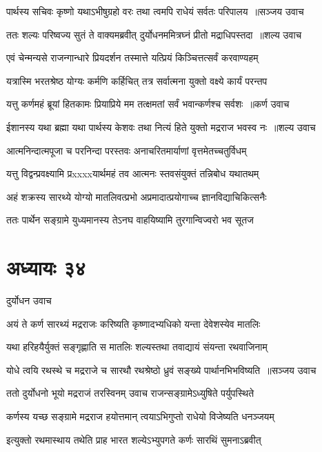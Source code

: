 \threelineshloka
{पार्थस्य सचिवः कृष्णो यथाऽभीषुग्रहो वरः}
{तथा त्वमपि राधेयं सर्वतः परिपालय ॥सञ्जय उवाच}
{}


\threelineshloka
{ततः शल्यः परिष्वज्य सुतं ते वाक्यमब्रवीत्}
{दुर्योधनममित्रघ्नं प्रीतो मद्राधिपस्तदा ॥शल्य उवाच}
{}


\twolineshloka
{एवं चेन्मन्यसे राजन्गान्धारे प्रियदर्शन}
{तस्मात्ते यत्प्रियं किञ्चित्तत्सर्वं करवाण्यहम्}


\twolineshloka
{यत्रास्मि भरतश्रेष्ठ योग्यः कर्मणि कर्हिचित्}
{तत्र सर्वात्मना युक्तो वक्ष्ये कार्यं परन्तप}


\threelineshloka
{यत्तु कर्णमहं ब्रूयां हितकामः प्रियाप्रिये}
{मम तत्क्षमतां सर्वं भवान्कर्णश्च सर्वशः ॥कर्ण उवाच}
{}


\threelineshloka
{ईशानस्य यथा ब्रह्मा यथा पार्थस्य केशवः}
{तथा नित्यं हिते युक्तो मद्रराज भवस्व नः ॥शल्य उवाच}
{}


\twolineshloka
{आत्मनिन्दात्मपूजा च परनिन्दा परस्तवः}
{अनाचरितमार्याणां वृत्तमेतच्चतुर्विधम्}


\twolineshloka
{यत्तु विद्वन्प्रवक्ष्यामि प्रxxxxयार्थमहं तव}
{आत्मनः स्तवसंयुक्तं तन्निबोध यथातथम्}


\twolineshloka
{अहं शक्रस्य सारथ्ये योग्यो मातलिवत्प्रभो}
{अप्रमादात्प्रयोगाच्च ज्ञानविद्याचिकित्सनैः}


\twolineshloka
{ततः पार्थेन सङ्ग्रामे युध्यमानस्य तेऽनघ}
{वाहयिष्यामि तुरगान्विज्वरो भव सूतज}


\chapter{अध्यायः ३४}
\twolineshloka
{दुर्योधन उवाच}
{}


\twolineshloka
{अयं ते कर्ण सारथ्यं मद्रराजः करिष्यति}
{कृष्णादभ्यधिको यन्ता देवेशस्येव मातलिः}


\twolineshloka
{यथा हरिहयैर्युक्तं सङ्गृह्णाति स मातलिः}
{शल्यस्तथा तवाद्यायं संयन्ता रथवाजिनाम्}


\threelineshloka
{योधे त्वयि रथस्थे च मद्रराजे च सारथौ}
{रथश्रेष्ठो ध्रुवं सङ्ख्ये पार्थानभिभविष्यति ॥सञ्जय उवाच}
{}


\twolineshloka
{ततो दुर्योधनो भूयो मद्रराजं तरस्विनम्}
{उवाच राजन्सङ्ग्रामेऽध्युषिते पर्युपस्थिते}


\twolineshloka
{कर्णस्य यच्छ सङ्ग्रामे मद्रराज हयोत्तमान्}
{त्वयाऽभिगुप्तो राधेयो विजेष्यति धनञ्जयम्}


\twolineshloka
{इत्युक्तो रथमास्थाय तथेति प्राह भारत}
{शल्येऽभ्युपगते कर्णः सारथिं सुमनाऽब्रवीत्}


